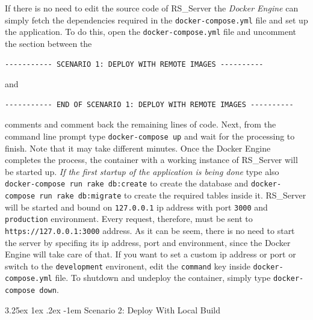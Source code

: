 \documentclass[a4paper, english]{article}
\makeatletter
\renewcommand\paragraph{\@startsection{paragraph}{5}{\z@}%
  {3.25ex \@plus1ex \@minus.2ex}%
  {-1em}%
  {\normalfont\normalsize\bfseries}}
\makeatother
\begin{document}
If there is no need to edit the source code of RS\_Server the \emph{Docker Engine} can simply fetch the dependencies required in the \verb|docker-compose.yml| file and set up the application. To do this, open the \verb|docker-compose.yml| file and uncomment the section between the 
\begin{verbatim}
----------- SCENARIO 1: DEPLOY WITH REMOTE IMAGES ----------
\end{verbatim}
and 
\begin{verbatim}
----------- END OF SCENARIO 1: DEPLOY WITH REMOTE IMAGES ----------
\end{verbatim} 
comments and comment back the remaining lines of code. Next, from the command line prompt type \verb|docker-compose up| and wait for the processing to finish. Note that it may take different minutes. Once the Docker Engine completes the process, the container with a working instance of RS\_Server will be started up. \emph{If the first startup of the application is being done} type also \verb|docker-compose run rake db:create| to create the database and \verb|docker-compose run rake db:migrate| to create the required tables inside it. RS\_Server will be started and bound on \verb|127.0.0.1| ip address with port \verb|3000| and \verb|production| environment. Every request, therefore, must be sent to \verb|https://127.0.0.1:3000| address. As it can be seem, there is no need to start the server by specifing its ip address, port and environment, since the Docker Engine will take care of that. If you want to set a custom ip address or port or switch to the \verb|development| environent, edit the \verb|command| key inside \verb|docker-compose.yml| file. To shutdown and undeploy the container, simply type \verb|docker-compose down|.

\paragraph{Scenario 2: Deploy With Local Build}
\end{document}

